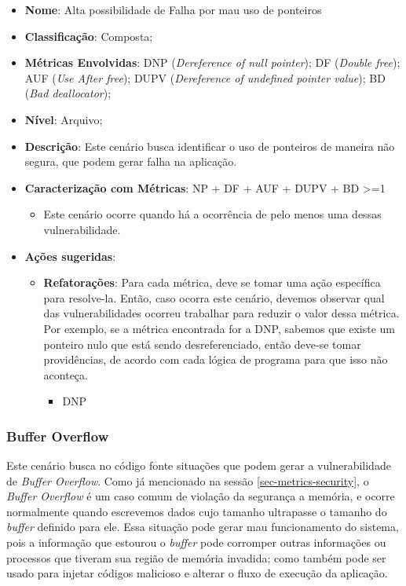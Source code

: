 \begin{itemize}
\item \textbf{Nome}: Alta possibilidade de Falha por mau uso de ponteiros
\item \textbf{Classificação}: Composta;
\item \textbf{Métricas Envolvidas}: DNP (\emph{Dereference of null pointer}); DF (\emph{Double free}); AUF (\emph{Use After free}); DUPV (\emph{Dereference of undefined pointer value}); BD (\emph{Bad deallocator});
\item \textbf{Nível}: Arquivo;
\item \textbf{Descrição}: Este cenário busca identificar o uso de ponteiros de maneira não segura, que podem gerar falha na aplicação.
\item \textbf{Caracterização com Métricas}: NP + DF + AUF + DUPV + BD >=1
	\begin{itemize}
	\item Este cenário ocorre quando há a ocorrência de pelo menos uma dessas vulnerabilidade.
	\end{itemize}
\item \textbf{Ações sugeridas}: 
	\begin{itemize}
	\item \textbf{Refatorações}: Para cada métrica, deve se tomar uma ação específica para resolve-la. Então, caso ocorra este cenário, devemos observar qual das vulnerabilidades ocorreu trabalhar para reduzir o valor dessa métrica. Por exemplo, se a métrica encontrada for a DNP, sabemos que existe um ponteiro nulo que está sendo desreferenciado, então deve-se tomar providências, de acordo com cada lógica de programa para que isso não aconteça.
		\begin{itemize}
			\item DNP
		\end{itemize}
	\end{itemize}
\end{itemize}


\subsubsection{Buffer Overflow}

Este cenário busca no código fonte situações que podem gerar a vulnerabilidade de \emph{Buffer Overflow}. Como já mencionado na sessão \ref{sec-metrics-security}, o \emph{Buffer Overflow} é um caso comum de violação da segurança a memória, e ocorre normalmente quando escrevemos dados cujo tamanho  ultrapasse o tamanho do \emph{buffer} definido para ele. Essa situação pode gerar  mau funcionamento do sistema, pois a informação que estourou o \emph{buffer} pode corromper outras informações ou processos que tiveram sua região de memória invadida; como também pode ser usado para injetar códigos malicioso e alterar o fluxo de execução da aplicação.

